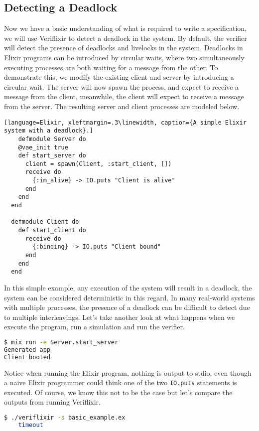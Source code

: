 \subsection{Detecting a Deadlock} \label{sec:deadlock}
Now we have a basic understanding of what is required to write a specification, we will use Veriflixir to detect a deadlock in the system. By default, the verifier will detect the presence of deadlocks and livelocks in the system. Deadlocks in Elixir programs can be introduced by circular waits, where two simultaneously executing processes are both waiting for a message from the other. To demonstrate this, we modify the existing client and server by introducing a circular wait. The server will now spawn the process, and expect to receive a message from the client, meanwhile, the client will expect to receive a message from the server. The resulting server and client processes are modeled below.
\begin{lstlisting}[language=Elixir, xleftmargin=.3\linewidth, caption={A simple Elixir system with a deadlock}.]
    defmodule Server do
    @vae_init true
    def start_server do
      client = spawn(Client, :start_client, [])
      receive do
        {:im_alive} -> IO.puts "Client is alive"
      end
    end
  end
  
  defmodule Client do
    def start_client do
      receive do
        {:binding} -> IO.puts "Client bound"
      end
    end
  end  
\end{lstlisting}
In this simple example, any execution of the system will result in a deadlock, the system can be considered deterministic in this regard. In many real-world systems with multiple processes, the presence of a deadlock can be difficult to detect due to multiple interleavings. Let's take another look at what happens when we execute the program, run a simulation and run the verifier.
\begin{lstlisting}[language=bash, xleftmargin=.3\linewidth]
$ mix run -e Server.start_server
Generated app
Client booted

\end{lstlisting}
Notice when running the Elixir program, nothing is output to stdio, even though a naive Elixir programmer could think one of the two \texttt{IO.puts} statements is executed. Of course, we know this not to be the case but let's compare the outputs from running Veriflixir.
\begin{lstlisting}[language=bash, xleftmargin=.3\linewidth]
    $ ./veriflixir -s basic_example.ex
    timeout
\end{lstlisting}
